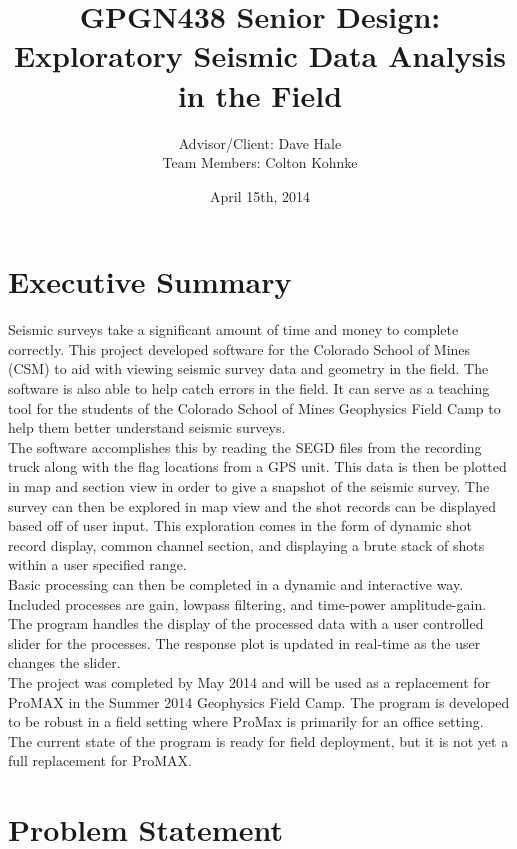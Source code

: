 \documentclass[12pt]{article}
\author{Advisor/Client: Dave Hale \\ Team Members: Colton Kohnke}
\title{GPGN438 Senior Design: \\ Exploratory Seismic Data Analysis in the Field}
\date{April 15th, 2014}
\begin{document}
\maketitle
\newpage

\section{Executive Summary}

Seismic surveys take a significant amount of time and money to complete correctly. This project developed software for the Colorado School of Mines (CSM) to aid with viewing seismic survey data and geometry in the field. The software is also able to help catch errors in the field. It can serve as a teaching tool for the students of the Colorado School of Mines Geophysics Field Camp to help them better understand seismic surveys. \\

The software accomplishes this by reading the SEGD files from the recording truck along with the flag locations from a GPS unit. This data is then be plotted in map and section view in order to give a snapshot of the seismic survey. The survey can then be explored in map view and the shot records can be displayed based off of user input. This exploration comes in the form of dynamic shot record display, common channel section, and displaying a brute stack of shots within a user specified range.\\

Basic processing can then be completed in a dynamic and interactive way. Included processes are gain, lowpass filtering, and time-power amplitude-gain. The program handles the display of the processed data with a user controlled slider for the processes. The response plot is updated in real-time as the user changes the slider. \\

The project was completed by May 2014 and will be used as a replacement for ProMAX in the Summer 2014 Geophysics Field Camp. The program is developed to be robust in a field setting where ProMax is primarily for an office setting. The current state of the program is ready for field deployment, but it is not yet a full replacement for ProMAX. 

\newpage
\tableofcontents
\listoffigures
\listoftables
\newpage

\section{Problem Statement}
\end{document}
